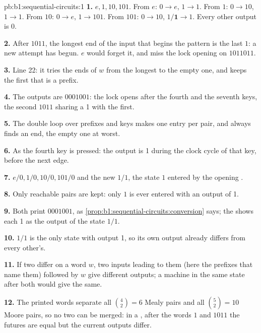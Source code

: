 \begin{solution}{pb:b1:sequential-circuits:1}
\textbf{1.}  $e, 1, 10, 101$. From $e$: $0 \to e$, $1 \to 1$. From $1$: $0 \to 10$, $1 \to 1$. From $10$: $0 \to e$,
$1 \to 101$. From $101$: $0 \to 10$, $1/\mathbf{1} \to 1$. Every other output is 0.

\textbf{2.} After $1011$, the longest end of the input that begins the pattern is the last $1$: a new attempt has begun.
$e$ would forget it, and miss the lock opening on $1011011$.

\textbf{3.} Line 22: it tries the ends of $w$ from the longest to the empty one, and keeps the first that is a prefix.

\textbf{4.} The outputs are $0001001$: the lock opens after the fourth and the seventh keys, the second $1011$ sharing a 1
with the first.

\textbf{5.} The double loop over prefixes and keys makes one entry per pair, and  always finds an end, the
empty one at worst.

\textbf{6.} As the fourth key is pressed: the output is 1 during the clock cycle of that key, before the next edge.

\textbf{7.} $e/0, 1/0, 10/0, 101/0$ and the new $1/1$, the state $1$ entered by the opening .

\textbf{8.} Only reachable pairs are kept: only $1$ is ever entered with an output of 1.

\textbf{9.} Both print $0001001$, as \cref{prop:b1:sequential-circuits:conversion} says; the  shows each 1 as
the output of the state $1/1$.

\textbf{10.} $1/1$ is the only state with output 1, so its own output already differs from every other's.

\textbf{11.} If two  differ on a word $w$, two inputs leading to them (here the prefixes that name them) followed by
$w$ give different outputs; a machine in the same state after both would give the same.

\textbf{12.} The printed words separate all $\binom{4}{2} = 6$ Mealy pairs and all $\binom{5}{2} = 10$ Moore pairs, so no
two  can be merged: in a , after the words $1$ and $1011$ the futures are equal but the current
outputs differ.


\end{solution}
